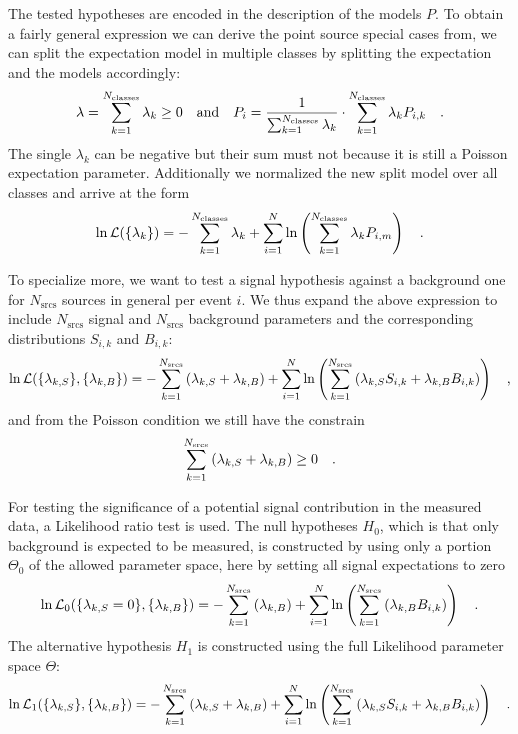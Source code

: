 The tested hypotheses are encoded in the description of the models $P$.
To obtain a fairly general expression we can derive the point source special cases from, we can split the expectation model in multiple classes by splitting the expectation and the models accordingly:
\begin{equation}
  \lambda = \sum_{k=1}^{N_\text{classes}} \lambda_k \geq 0
  \quad\text{and}\quad
  P_i = \frac{1}{\sum_{k=1}^{N_\text{classes}} \lambda_k}\cdot
         \sum_{k=1}^{N_\text{classes}} \lambda_k P_{i,k}
  \quad\text{.}
\end{equation}
The single $\lambda_k$ can be negative but their sum must not because it is still a Poisson expectation parameter.
Additionally we normalized the new split model over all classes and arrive at the form
\begin{equation}
  \ln\mathcal{L}(\{\lambda_k\})
  = -\sum_{k=1}^{N_\text{classes}} \lambda_k +
    \sum_{i=1}^N \ln\left(\sum_{k=1}^{N_\text{classes}}
      \lambda_k P_{i,m} \right)
  \quad\text{.}
\end{equation}

To specialize more, we want to test a signal hypothesis against a background one for $N_\text{srcs}$ sources in general per event $i$.
We thus expand the above expression to include $N_\text{srcs}$ signal and $N_\text{srcs}$ background parameters and the corresponding distributions $S_{i,k}$ and $B_{i,k}$:
\begin{equation}
  \ln\mathcal{L}(\{\lambda_{k,S}\}, \{\lambda_{k,B}\})
  = -\sum_{k=1}^{N_\text{srcs}}\left(\lambda_{k,S}+\lambda_{k,B}\right) +
    \sum_{i=1}^N \ln\left(\sum_{k=1}^{N_\text{srcs}}\left(
      \lambda_{k,S} S_{i,k}+\lambda_{k,B} B_{i,k}\right)\right)
  \quad\text{,}
\end{equation}
and from the Poisson condition we still have the constrain
\begin{equation}
  \sum_{k=1}^{N_\text{srcs}}\left(\lambda_{k,S}+\lambda_{k,B}\right) \geq 0
  \quad\text{.}
\end{equation}

For testing the significance of a potential signal contribution in the measured data, a Likelihood ratio test is used.
The null hypotheses $H_0$, which is that only background is expected to be measured, is constructed by using only a portion $\Theta_0$ of the allowed parameter space, here by setting all signal expectations to zero
\begin{equation}
  \ln\mathcal{L}_0(\{\lambda_{k,S}=0\}, \{\lambda_{k,B}\})
  = -\sum_{k=1}^{N_\text{srcs}}\left(\lambda_{k,B}\right) +
    \sum_{i=1}^N \ln\left(\sum_{k=1}^{N_\text{srcs}}\left(
      \lambda_{k,B} B_{i,k}\right)\right)
  \quad\text{.}
\end{equation}
The alternative hypothesis $H_1$ is constructed using the full Likelihood parameter space $\Theta$:
\begin{equation}
  \ln\mathcal{L}_1(\{\lambda_{k,S}\}, \{\lambda_{k,B}\})
  = -\sum_{k=1}^{N_\text{srcs}}\left(\lambda_{k,S}+
                                     \lambda_{k,B}\right) +
    \sum_{i=1}^N \ln\left(\sum_{k=1}^{N_\text{srcs}}\left(
      \lambda_{k,S} S_{i,k}+\lambda_{k,B} B_{i,k}\right)\right)
  \quad\text{.}
\end{equation}

